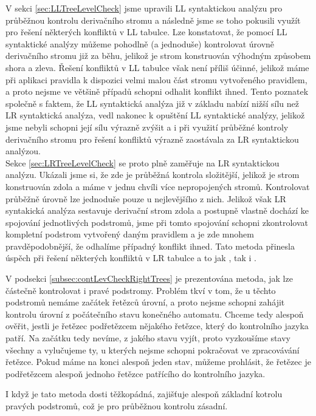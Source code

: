 V sekci \ref{sec:LLTreeLevelCheck} jsme upravili LL syntaktickou
analýzu pro průběžnou kontrolu derivačního stromu a následně jsme se toho
pokusili využít pro řešení některých konfliktů v LL tabulce. Lze konstatovat,
že pomocí LL syntaktické analýzy můžeme pohodlně (a jednoduše) kontrolovat
úrovně derivačního stromu již za běhu, jelikož je strom konstruován výhodným
způsobem shora a zleva. Řešení konfliktů v LL tabulce však není příliš účinné,
jelikož máme při aplikaci pravidla k dispozici velmi malou část stromu
vytvořeného pravidlem, a proto nejsme ve většině případů schopni odhalit
konflikt ihned. Tento poznatek společně s faktem, že LL syntaktická analýza již
v základu nabízí nižší sílu než LR syntaktická analýza, vedl nakonec k opuštění
LL syntaktické analýzy, jelikož jsme nebyli schopni její sílu výrazně zvýšit
a i při využití průběžné kontroly derivačního stromu pro řešení konfliktů výrazně
zaostávala za LR syntaktickou analýzou.\\


Sekce \ref{sec:LRTreeLevelCheck} se proto plně zaměřuje na LR syntaktickou
analýzu. Ukázali jsme si, že zde je průběžná kontrola složitější, jelikož
je strom konstruován zdola a máme v jednu chvíli více nepropojených stromů.
Kontrolovat průběžně úrovně lze jednoduše pouze u nejlevějšího z nich.
Jelikož však LR syntakická analýza sestavuje derivační strom zdola a
postupně vlastně dochází ke spojování jednotlivých podstromů, jsme
při tomto spojování schopni zkontrolovat kompletní podstrom vytvořený daným
pravidlem a je zde mnohem pravděpodobnější, že odhalíme případný konflikt
ihned. Tato metoda přinesla úspěch při řešení
některých konfliktů v LR tabulce a to jak , tak i .

V podsekci \ref{subsec:contLevCheckRightTrees} je prezentována metoda,
jak lze částečně kontrolovat i pravé podstromy. Problém tkví v tom, že u těchto
podstromů nemáme začátek řetězců úrovní, a proto nejsme schopni zahájit kontrolu
úrovní z počátečního stavu konečného automatu. Chceme tedy alespoň ověřit,
jestli je řetězec podřetězcem nějakého řetězce, který do kontrolního jazyka
patří. Na začátku tedy nevíme, z jakého stavu vyjít, proto vyzkoušíme stavy všechny
a vylučujeme ty, u kterých nejsme schopni pokračovat ve zpracovávání řetězce.
Pokud máme na konci alespoň jeden stav, můžeme prohlásit, že řetězec je podřetězcem
alespoň jednoho řetězce patřícího do kontrolního jazyka.

I když je tato metoda dosti těžkopádná, zajišťuje alespoň základní kotrolu pravých
podstromů, což je pro průběžnou kontrolu zásadní.

